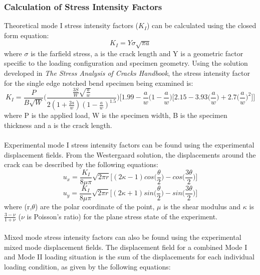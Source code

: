 \documentclass[12pt]{article}
\begin{document}
\subsubsection{Calculation of Stress Intensity Factors} %
Theoretical mode I stress intensity factors ($K_{I}$) can be calculated using the closed form equation:
\begin{equation}
K_{I} = Y\sigma\sqrt{\pi a}
\end{equation}
where $\sigma$ is the farfield stress, a is the crack length and Y is a geometric factor specific to the loading configuration and specimen geometry. Using the solution developed in \textit{The Stress Analysis of Cracks Handbook}, the stress intensity factor for the single edge notched bend specimen being examined is:
\begin{equation}
K_{I} = \frac{P}{B\sqrt{W}}\Bigg(\frac{\frac{3S}{W}\sqrt{\frac{a}{w}}}{2(1+\frac{2a}{w})(1-\frac{a}{w})^{1.5}}\Bigg)\Bigg[1.99-\frac{a}{w}\Big(1-\frac{a}{w}\Big)\Big[2.15-3.93\Big(\frac{a}{w}\Big)+2.7\Big(\frac{a}{w}\Big)^2\Big]\Bigg]
\end{equation}
where P is the applied load, W is the specimen width, B is the specimen thickness and a is the crack length. 
\\ \\
Experimental mode I stress intensity factors can be found using the experimental displacement fields. From the Westergaard solution, the displacements around the crack can be described by the following equations:
\begin{equation}
u_{x} = \frac{K_{I}}{8\mu \pi}\sqrt{2\pi r}\bigg[(2\kappa-1)cos\bigg(\frac{\theta}{2}\bigg)-cos\bigg(\frac{3\theta}{2}\bigg)\bigg]
\end{equation}
\begin{equation}
u_{y} = \frac{K_{I}}{8\mu \pi}\sqrt{2\pi r}\bigg[(2\kappa+1)sin\bigg(\frac{\theta}{2}\bigg)-sin\bigg(\frac{3\theta}{2}\bigg)\bigg]
\end{equation}
where (r,$\theta$) are the polar coordinate of the point, $\mu$ is the shear modulus and $\kappa$ is $\frac{3-\nu}{1+\nu}$ ($\nu$ is Poisson's ratio) for the plane stress state of the experiment.
\\ \\
Mixed mode stress intensity factors can also be found using the experimental mixed mode displacement fields. The displacement field for a combined Mode I and Mode II loading situation is the sum of the displacements for each individual loading condition, as given by the following equations:
\end{document}
